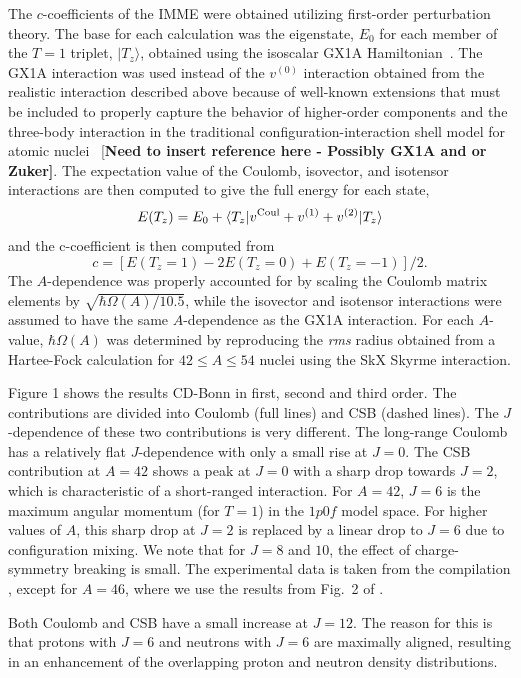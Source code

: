 \documentclass[
10pt,
showpacs,preprintnumbers,footinbib,
amsmath,amssymb,
aps,
prl,twocolumn,groupedaddress,superscriptaddress,
showkeys
]{revtex4-1}
\begin{document}
The $c$-coefficients of the IMME were obtained utilizing first-order
perturbation theory. The base for each calculation was the eigenstate,
$E_{0}$ for each member of the $T=1$ triplet, $ \vert T_{z} \rangle$,
obtained using the isoscalar GX1A Hamiltonian~\cite{ref:GX1A}. The GX1A interaction
was used instead of the $v^{(0)}$ interaction obtained from the
realistic interaction described above because of well-known extensions
that must be included to properly capture the behavior of higher-order
components and the three-body interaction in the traditional
configuration-interaction shell model for atomic nuclei~
{\color{red} {[\bf Need to insert reference here - Possibly GX1A and or Zuker]}}. The
expectation value of the Coulomb, isovector, and isotensor
interactions are then computed to give the full energy for each state,
\[
E(T_{z}) = E_{0} + \langle T_{z} \vert   v^{{\rm Coul}} + v^{(1)} + v^{(2)}\vert T_{z} \rangle
\]
and the c-coefficient is then computed from
\[
c = [E(T_{z} =1) - 2E(T_{z} =0) + E(T_{z} =-1)]/2.
\]
The $A$-dependence was properly accounted for by scaling the Coulomb
matrix elements by $  \sqrt{\hbar\Omega(A)/10.5}  $, while the isovector and
isotensor interactions were assumed to have the same $A$-dependence as
the GX1A interaction. For each $A$-value, $\hbar\Omega(A)$ was
determined by reproducing the {\it rms} radius obtained from a Hartee-Fock
calculation for $42 \le A\le 54$ nuclei using the SkX Skyrme interaction.

Figure 1 shows the results CD-Bonn in first, second and third order.
The contributions are divided into Coulomb (full lines)
and CSB (dashed lines). The $J$-dependence of these
two contributions is very different. The long-range Coulomb
has a relatively flat $J$-dependence with only
a small rise at $J=0$. The CSB contribution at $A=42$
shows a peak at $J=0$ with a sharp drop towards $J=2$, which
is characteristic of a short-ranged interaction.
For $A=42$, $J=6$ is the maximum
angular momentum (for $T=1$) in the $1p0f$ model space.
For higher values of $A$, this sharp drop at $  J=2  $ is replaced
by a linear drop to $J=6$ due to configuration mixing.
We note that for $J=8$ and $10$, the effect of charge-symmetry breaking
is small. The experimental data is taken from the compilation \cite{2013la}, except  
for $A=46$, where we use the results from Fig.~2 of \cite{2001ga}.

Both Coulomb and CSB have a small increase at $J=12$.
The reason for this is that
protons with $J=6$ and neutrons with $J=6$
are maximally aligned, resulting in an enhancement of the
overlapping proton and neutron density distributions.
\end{document}
